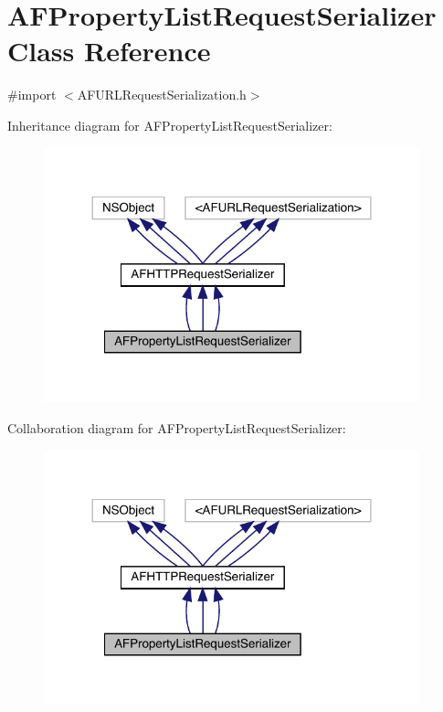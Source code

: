 \hypertarget{interface_a_f_property_list_request_serializer}{}\section{A\+F\+Property\+List\+Request\+Serializer Class Reference}
\label{interface_a_f_property_list_request_serializer}


{\ttfamily \#import $<$A\+F\+U\+R\+L\+Request\+Serialization.\+h$>$}



Inheritance diagram for A\+F\+Property\+List\+Request\+Serializer\+:\nopagebreak
\begin{figure}[H]
\begin{center}
\leavevmode
\includegraphics[width=308pt]{interface_a_f_property_list_request_serializer__inherit__graph}
\end{center}
\end{figure}


Collaboration diagram for A\+F\+Property\+List\+Request\+Serializer\+:\nopagebreak
\begin{figure}[H]
\begin{center}
\leavevmode
\includegraphics[width=308pt]{interface_a_f_property_list_request_serializer__coll__graph}
\end{center}
\end{figure}
